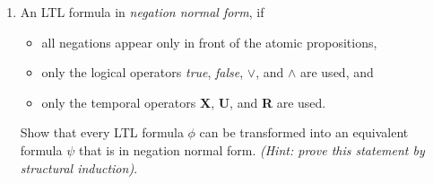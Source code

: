 \begin{enumerate}
\item

An LTL formula in \emph{negation normal form}, if
\begin{itemize}
\item all negations appear only in front of the atomic propositions,
\item only the logical operators \emph{true}, \emph{false}, $\vee$, and $\wedge$ are used, and
\item only the temporal operators \textbf{X}, \textbf{U}, and \textbf{R} are used.
\end{itemize}

Show that every LTL formula $\phi$ can be transformed into an equivalent formula $\psi$ that is in negation normal form.
\emph{(Hint: prove this statement by structural induction)}.

\end{enumerate}